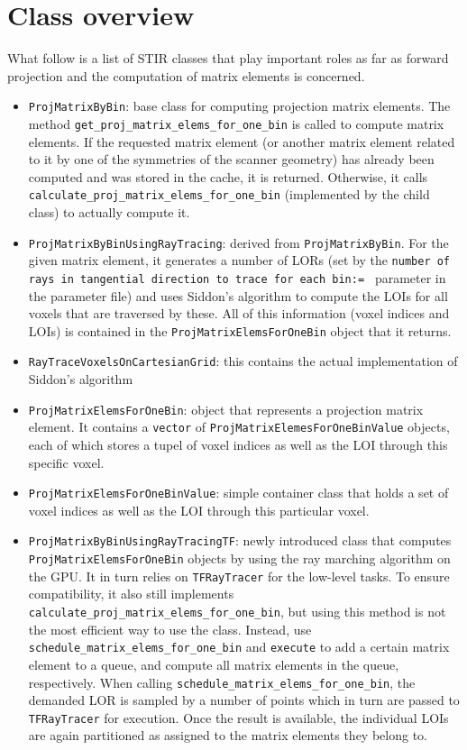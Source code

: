 \documentclass[a4paper, 11pt]{article}
\begin{document}
  \section{Class overview}
  What follow is a list of STIR classes that play important roles as far as forward projection and the computation of matrix elements is concerned. 
  \begin{itemize}
    \item \texttt{ProjMatrixByBin}: base class for computing projection matrix elements. The method \texttt{get\_proj\-\_matrix\_elems\_for\_one\_bin} is called to compute matrix elements. If the requested matrix element (or another matrix element related to it by one of the symmetries of the scanner geometry) has already been computed and was stored in the cache, it is returned. Otherwise, it calls \texttt{calculate\_proj\_matrix\_elems\_for\_one\_bin} (implemented by the child class) to actually compute it.
    \item \texttt{ProjMatrixByBinUsingRayTracing}: derived from \texttt{ProjMatrixByBin}. For the given matrix element, it generates a number of LORs (set by the \texttt{number of rays in tangential direction to trace for each bin:= } parameter in the parameter file) and uses Siddon's algorithm to compute the LOIs for all voxels that are traversed by these. All of this information (voxel indices and LOIs) is contained in the \texttt{ProjMatrixElemsForOneBin} object that it returns.
    \item \texttt{RayTraceVoxelsOnCartesianGrid}: this contains the actual implementation of Siddon's algorithm
    \item \texttt{ProjMatrixElemsForOneBin}: object that represents a projection matrix element. It contains a \texttt{vector} of \texttt{ProjMatrixElemesForOneBinValue} objects, each of which stores a tupel of voxel indices as well as the LOI through this specific voxel.
    \item \texttt{ProjMatrixElemsForOneBinValue}: simple container class that holds a set of voxel indices as well as the LOI through this particular voxel.
    \item \texttt{ProjMatrixByBinUsingRayTracingTF}: newly introduced class that computes \texttt{ProjMatrixElems\-ForOneBin} objects by using the ray marching algorithm on the GPU. It in turn relies on \texttt{TFRayTracer} for the low-level tasks. To ensure compatibility, it also still implements \texttt{calculate\-\_proj\_matrix\_elems\_for\_one\_bin}, but using this method is not the most efficient way to use the class. Instead, use \texttt{schedule\_matrix\_elems\_for\_one\_bin} and \texttt{execute} to add a certain matrix element to a queue, and compute all matrix elements in the queue, respectively. When calling \texttt{schedule\_matrix\_elems\_for\_one\_bin}, the demanded LOR is sampled by a number of points which in turn are passed to \texttt{TFRayTracer} for execution. Once the result is available, the individual LOIs are again partitioned as assigned to the matrix elements they belong to.

\end{itemize}
\end{document}
